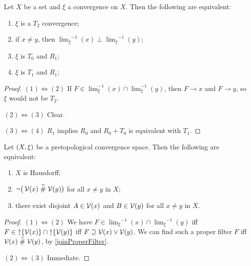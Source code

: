 \begin{proposition}
Let $X$ be a set and $\xi$ a convergence on $X$. Then the following are equivalent:
\begin{enumerate}
\item $\xi$ is a $T_2$ convergence;
\item if $x \neq y$, then ${\lim_\xi}^{-1}(x)\perp {\lim_\xi}^{-1}(y)$;
\item $\xi$ is $T_0$ and $R_1$;
\item $\xi$ is $T_1$ and $R_1$;
\end{enumerate}
\end{proposition}
\begin{proof}
$(1) \Leftrightarrow (2)$ If $F \in \lim_\xi^{-1}(x)\cap \lim_\xi^{-1}(y)$, then $F \to x$ and $F\to y$, so $\xi$ would not be $T_2$.

$(2) \Leftrightarrow (3)$ Clear.

$(3) \Leftrightarrow (4)$ $R_1$ implies $R_0$ and $R_0+T_0$ is equivalent with $T_1$.
\end{proof}

\begin{proposition} \label{pretopologicalHausdorff}
Let $\sSet{X,\xi}$ be a pretopological convergence space. Then the following are equivalent:
\begin{enumerate}
\item $X$ is Hausdorff;
\item $\neg\big(\operatorname{\mathcal{V}}(x) \mathrel{\widehat{\#}} \operatorname{\mathcal{V}}(y)\big)$ for all $x\neq y$ in $X$;
\item there exist disjoint $A\in \operatorname{\mathcal{V}}(x)$ and $B\in \operatorname{\mathcal{V}}(y)$ for all $x\neq y$ in $X$.
\end{enumerate}
\end{proposition}
\begin{proof}
$(1) \Leftrightarrow (2)$ We have $F\in {\lim_\xi}^{-1}(x)\cap {\lim_\xi}^{-1}(y)$ iff $F\in \operatorname{\uparrow} \{\operatorname{\mathcal{V}}(x)\} \cap \operatorname{\uparrow} \{\operatorname{\mathcal{V}}(y)\}$ iff $F \supseteq \operatorname{\mathcal{V}}(x)\vee \operatorname{\mathcal{V}}(y)$. We can find such a proper filter $F$ iff $\operatorname{\mathcal{V}}(x) \mathrel{\widehat{\#}} \operatorname{\mathcal{V}}(y)$, by \ref{joinProperFilter}.

$(2) \Leftrightarrow (3)$ Immediate.
\end{proof}

